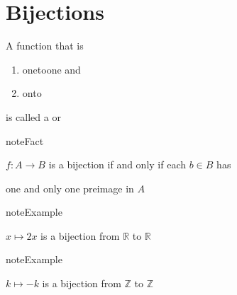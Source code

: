 \documentclass[letterpaper,10pt,english]{jupyterBook}
\begin{document}
\section{Bijections}
\label{\detokenize{03.set_theory:bijections}}
\sphinxAtStartPar
A function that is
\begin{enumerate}
%
\item {} 
\sphinxAtStartPar
one\sphinxhyphen{}to\sphinxhyphen{}one and

\item {} 
\sphinxAtStartPar
onto

\end{enumerate}

\sphinxAtStartPar
is called a  or 

\begin{figure}[htbp]
\centering

\noindent{}
\end{figure}

\begin{sphinxadmonition}{note}{Fact}

\sphinxAtStartPar
\(f \colon A \to B\) is a bijection if and only if each \(b \in B\) has
\end{sphinxadmonition}

\sphinxAtStartPar
one and only one preimage in \(A\)

\begin{sphinxadmonition}{note}{Example}

\sphinxAtStartPar
\(x \mapsto 2x\) is a bijection from \(\mathbb{R}\) to \(\mathbb{R}\)
\end{sphinxadmonition}

\begin{figure}[htbp]
\centering

\noindent{}
\end{figure}

\begin{sphinxadmonition}{note}{Example}

\sphinxAtStartPar
\(k \mapsto -k\) is a bijection from \(\mathbb{Z}\) to \(\mathbb{Z}\)
\end{sphinxadmonition}

\begin{figure}[htbp]
\centering

\noindent{}
\end{figure}
\end{document}
